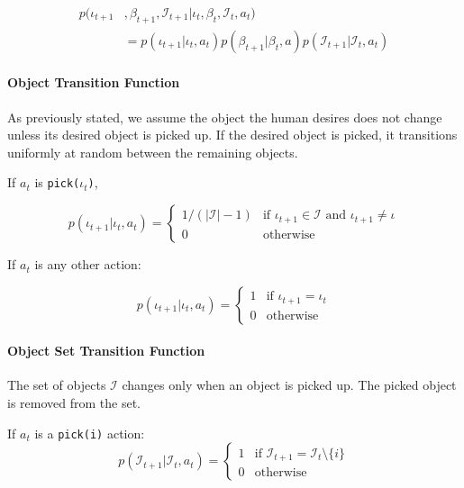 \documentclass{article}
\newcommand{\Iota}{\mathcal{I}}
\begin{document}
\begin{multicols}{2}
\begin{align*}
	p(\iota_{t+1}&, \beta_{t+1}, \Iota_{t+1} | \iota_t, \beta_t, \Iota_t, a_t) \\
	&=  p(\iota_{t+1} | \iota_t, a_t) p(\beta_{t+1} | \beta_t, a) p(\Iota_{t+1} | \Iota_t, a_t)
\end{align*}

\paragraph{Object Transition Function}
As previously stated, we assume the object the human desires does not change unless its desired object is picked up. If the desired object is picked, it transitions uniformly at random between the remaining objects. 

If $a_t$ is \texttt{pick($\iota_t$)}, 

\begin{equation*}
	p(\iota_{t+1} | \iota_t, a_t) = \begin{cases}
		1/(|\Iota|-1) & \text{if } \iota_{t+1} \in \Iota \text{ and } \iota_{t+1} \ne \iota \\
		0 & \text{otherwise} 
	\end{cases}
\end{equation*}


If $a_t$ is any other action: 

\begin{equation*}
	p(\iota_{t+1} | \iota_t, a_t) = \begin{cases} 
		1 & \text{if $\iota_{t+1} = \iota_t$} \\
		0 & \text{otherwise}
	\end{cases}
\end{equation*}

\paragraph{Object Set Transition Function}

The set of objects $\Iota$ changes only when an object is picked up. The picked object is removed from the set. 

If $a_t$ is a \texttt{pick(i)} action: 
\begin{equation*}
	p(\Iota_{t+1} | \Iota_t, a_t) = \begin{cases}
		1 & \text{if $\Iota_{t+1} = \Iota_t \setminus \{i\}$} \\ 
		0 & \text{otherwise}
	\end{cases}
\end{equation*}



\end{multicols}
\end{document}
